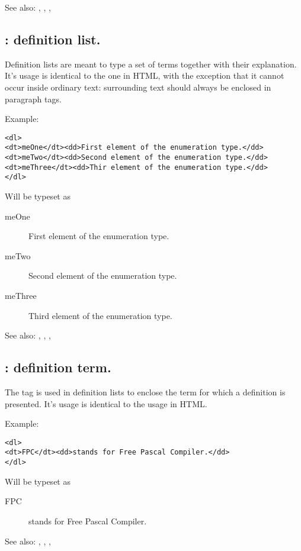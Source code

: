 See also: , , , 

\subsection{ : definition list.}
\label{tag:dl}
Definition lists are meant to type a set of terms together with their
explanation. It's usage is identical to the one in HTML, with the exception
that it cannot occur inside ordinary text: surrounding text should always be
enclosed in paragraph tags.

Example:
\begin{verbatim}
<dl>
<dt>meOne</dt><dd>First element of the enumeration type.</dd>
<dt>meTwo</dt><dd>Second element of the enumeration type.</dd>
<dt>meThree</dt><dd>Thir element of the enumeration type.</dd>
</dl>
\end{verbatim}
Will be typeset as
\begin{description}
\item[meOne] First element of the enumeration type.
\item[meTwo] Second element of the enumeration type.
\item[meThree] Third element of the enumeration type.
\end{description}

See also: , , , 

\subsection{ : definition term.}
\label{tag:dt}
The  tag is used in definition lists to enclose the term for which a
definition is presented. It's usage is identical to the usage in HTML.

Example:
\begin{verbatim}
<dl>
<dt>FPC</dt><dd>stands for Free Pascal Compiler.</dd>
</dl>
\end{verbatim}
Will be typeset as
\begin{description}
\item[FPC] stands for Free Pascal Compiler.
\end{description}

See also: , , , 


